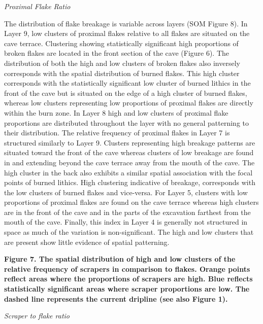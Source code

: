 \documentclass[smallextended]{svjour3}       %
\begin{document}
\emph{Proximal Flake Ratio}

The distribution of flake breakage is variable across layers (SOM Figure
8). In Layer 9, low clusters of proximal flakes relative to all flakes
are situated on the cave terrace. Clustering showing statistically
significant high proportions of broken flakes are located in the front
section of the cave (Figure 6). The distribution of both the high and
low clusters of broken flakes also inversely corresponds with the
spatial distribution of burned flakes. This high cluster corresponds
with the statistically significant low cluster of burned lithics in the
front of the cave but is situated on the edge of a high cluster of
burned flakes, whereas low clusters representing low proportions of
proximal flakes are directly within the burn zone. In Layer 8 high and
low clusters of proximal flake proportions are distributed throughout
the layer with no general patterning to their distribution. The relative
frequency of proximal flakes in Layer 7 is structured similarly to Layer
9. Clusters representing high breakage patterns are situated toward the
front of the cave whereas clusters of low breakage are found in and
extending beyond the cave terrace away from the mouth of the cave. The
high cluster in the back also exhibits a similar spatial association
with the focal points of burned lithics. High clustering indicative of
breakage, corresponds with the low clusters of burned flakes and
vice-versa. For Layer 5, clusters with low proportions of proximal
flakes are found on the cave terrace whereas high clusters are in the
front of the cave and in the parts of the excavation farthest from the
mouth of the cave. Finally, this index in Layer 4 is generally not
structured in space as much of the variation is non-significant. The
high and low clusters that are present show little evidence of spatial
patterning.

\textbf{Figure 7. The spatial distribution of high and low clusters of
the relative frequency of scrapers in comparison to flakes. Orange
points reflect areas where the proportions of scrapers are high. Blue
reflects statistically significant areas where scraper proportions are
low. The dashed line represents the current dripline (see also Figure
1).}

\emph{Scraper to flake ratio}
\end{document}

